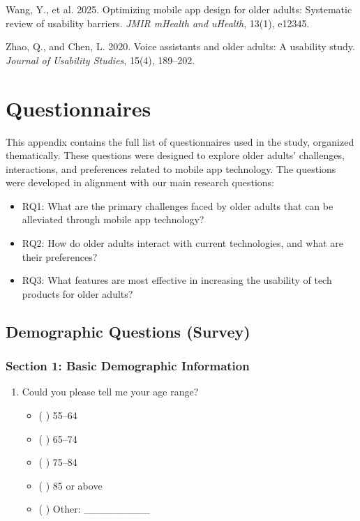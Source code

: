 \documentclass[acmlarge]{acmart}
\begin{document}
{\begin{thebibliography}{50}
Wang, Y., et al. 2025. Optimizing mobile app design for older adults: Systematic review of usability barriers. \textit{JMIR mHealth and uHealth}, 13(1), e12345.

Zhao, Q., and Chen, L. 2020. Voice assistants and older adults: A usability study. \textit{Journal of Usability Studies}, 15(4), 189--202.

\end{thebibliography}

\appendix

\section{Questionnaires}
This appendix contains the full list of questionnaires used in the study, organized thematically. These questions were designed to explore older adults' challenges, interactions, and preferences related to mobile app technology. The questions were developed in alignment with our main research questions:
\begin{itemize}
    \item RQ1: What are the primary challenges faced by older adults that can be alleviated through mobile app technology?
    \item RQ2: How do older adults interact with current technologies, and what are their preferences?
    \item RQ3: What features are most effective in increasing the usability of tech products for older adults?
\end{itemize}

\subsection{Demographic Questions (Survey)}
\subsubsection{Section 1: Basic Demographic Information}
\begin{enumerate}
    \item Could you please tell me your age range?
    \begin{itemize}
        \item ( ) 55–64
        \item ( ) 65–74
        \item ( ) 75–84
        \item ( ) 85 or above
        \item ( ) Other: \_\_\_\_\_\_\_\_\_
    \end{itemize}
    

\end{enumerate}}
\end{document}
